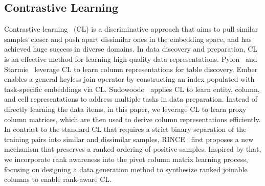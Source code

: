 
\subsection{Contrastive Learning}
Contrastive learning~\cite{Moco} (CL) is a discriminative approach that aims to pull similar samples closer and push apart dissimilar ones in the embedding space, and has achieved huge success in diverse domains.
In data discovery and preparation, CL is an effective method for learning high-quality data representations. Pylon~\cite{Pylon} and Starmie~\cite{starmine} leverage CL to learn column representations for table discovery. Ember~\cite{Ember}  enables a general keyless join operator by constructing an index populated with task-specific embeddings via CL. Sudowoodo~\cite{Sudowoodo} applies CL to learn entity, column, and cell representations to address multiple tasks in data preparation. Instead of directly learning the data items, in this paper, we leverage CL to learn proxy column matrices, which are then used to derive column representations efficiently. In contrast to the standard CL that requires a strict binary separation of the training pairs into similar and dissimilar samples, RINCE~\cite{2022ranking} first proposes a new mechanism that preserves a ranked ordering of positive samples. Inspired by that, we incorporate rank awareness into the pivot column matrix learning process, focusing on designing a data generation method to synthesize ranked joinable columns to enable rank-aware CL.